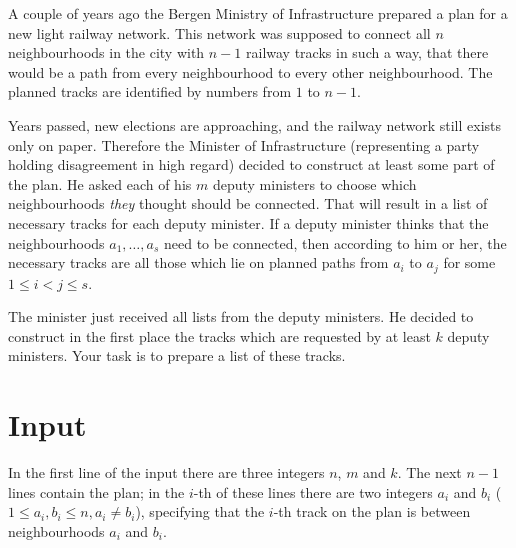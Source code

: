 
\noindent
A couple of years ago the Bergen Ministry of Infrastructure prepared a plan for a new light railway network. This network was supposed to connect all $n$ neighbourhoods in the city with $n - 1$ railway tracks in such a way, that there would be a path from every neighbourhood to every other neighbourhood. The planned tracks are identified by numbers from $1$ to $n - 1$.

Years passed, new elections are approaching, and the railway network still exists only on paper. Therefore the Minister of Infrastructure (representing a party holding disagreement in high regard) decided to construct at least some part of the plan. He asked each of his $m$ deputy ministers to choose which neighbourhoods \emph{they} thought should be connected. That will result in a list of necessary tracks for each deputy minister. If a deputy minister thinks that the neighbourhoods $a_1, \ldots, a_s$ need to be connected, then according to him or her, the necessary tracks are all those which lie on planned paths from $a_i$ to $a_j$ for some $1 \leq i < j \leq s$.

The minister just received all lists from the deputy ministers. He decided to construct in the first place the tracks which are requested by at least $k$ deputy ministers. Your task is to prepare a list of these tracks.

\section*{Input}

In the first line of the input there are three integers $n$, $m$ and $k$. The next $n - 1$ lines contain the plan; in the $i$-th of these lines there are two integers $a_i$ and $b_i$ ($1 \leq a_i, b_i \leq n, a_i \neq b_i$), specifying that the $i$-th track on the plan is between neighbourhoods $a_i$ and $b_i$.

